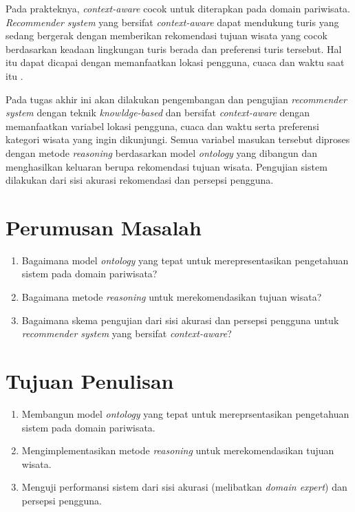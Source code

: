 Pada prakteknya, \textit{context-aware} cocok untuk diterapkan pada domain pariwisata. \textit{Recommender system} yang bersifat \textit{context-aware} dapat mendukung turis yang sedang bergerak dengan memberikan rekomendasi tujuan wisata yang cocok berdasarkan keadaan lingkungan turis berada dan preferensi turis tersebut\cite{alhazbi2013}. Hal itu dapat dicapai dengan memanfaatkan lokasi pengguna, cuaca dan waktu saat itu \cite{jakkhupan2015}. 
\par
Pada tugas akhir ini akan dilakukan pengembangan dan pengujian \textit{recommender system} dengan teknik \textit{knowldge-based} dan bersifat \textit{context-aware} dengan memanfaatkan variabel lokasi pengguna, cuaca dan waktu serta preferensi kategori wisata yang ingin dikunjungi. Semua variabel masukan tersebut diproses dengan metode \textit{reasoning} berdasarkan model \textit{ontology} yang dibangun dan menghasilkan keluaran berupa rekomendasi tujuan wisata. Pengujian sistem dilakukan dari sisi akurasi rekomendasi dan persepsi pengguna.

\section{Perumusan Masalah}
\begin{enumerate}
	\item Bagaimana model \textit{ontology} yang tepat untuk merepresentasikan pengetahuan sistem pada domain pariwisata?
	\item Bagaimana metode \textit{reasoning} untuk merekomendasikan tujuan wisata?
	\item Bagaimana skema pengujian dari sisi akurasi dan persepsi pengguna untuk \textit{recommender system} yang bersifat \textit{context-aware}?
	
\end{enumerate}
\section{Tujuan Penulisan}
\begin{enumerate}
	\item Membangun model \textit{ontology} yang tepat untuk mereprsentasikan pengetahuan sistem pada domain pariwisata.
	\item Mengimplementasikan metode \textit{reasoning} untuk merekomendasikan tujuan wisata.
	\item Menguji performansi sistem dari sisi akurasi (melibatkan \textit{domain expert}) dan persepsi pengguna.
\end{enumerate}
